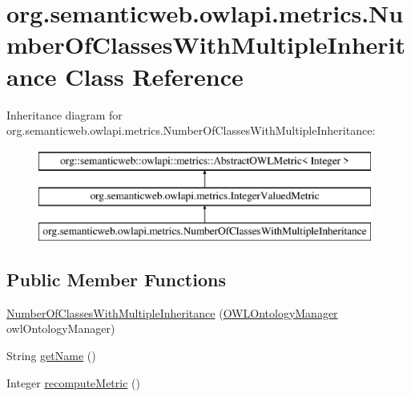 \hypertarget{classorg_1_1semanticweb_1_1owlapi_1_1metrics_1_1_number_of_classes_with_multiple_inheritance}{\section{org.\-semanticweb.\-owlapi.\-metrics.\-Number\-Of\-Classes\-With\-Multiple\-Inheritance Class Reference}
\label{classorg_1_1semanticweb_1_1owlapi_1_1metrics_1_1_number_of_classes_with_multiple_inheritance}
}
Inheritance diagram for org.\-semanticweb.\-owlapi.\-metrics.\-Number\-Of\-Classes\-With\-Multiple\-Inheritance\-:\begin{figure}[H]
\begin{center}
\leavevmode
\includegraphics[height=3.000000cm]{classorg_1_1semanticweb_1_1owlapi_1_1metrics_1_1_number_of_classes_with_multiple_inheritance}
\end{center}
\end{figure}
\subsection*{Public Member Functions}
\begin{DoxyCompactItemize}
\item 
\hyperlink{classorg_1_1semanticweb_1_1owlapi_1_1metrics_1_1_number_of_classes_with_multiple_inheritance_ab9741f593230c2c1ed130becf0c2102c}{Number\-Of\-Classes\-With\-Multiple\-Inheritance} (\hyperlink{interfaceorg_1_1semanticweb_1_1owlapi_1_1model_1_1_o_w_l_ontology_manager}{O\-W\-L\-Ontology\-Manager} owl\-Ontology\-Manager)
\item 
String \hyperlink{classorg_1_1semanticweb_1_1owlapi_1_1metrics_1_1_number_of_classes_with_multiple_inheritance_ab9eed84a912b257e145b3ca68432ed76}{get\-Name} ()
\item 
Integer \hyperlink{classorg_1_1semanticweb_1_1owlapi_1_1metrics_1_1_number_of_classes_with_multiple_inheritance_a2e5e94487874596f54e53d3344b40ea2}{recompute\-Metric} ()
\end{DoxyCompactItemize}
